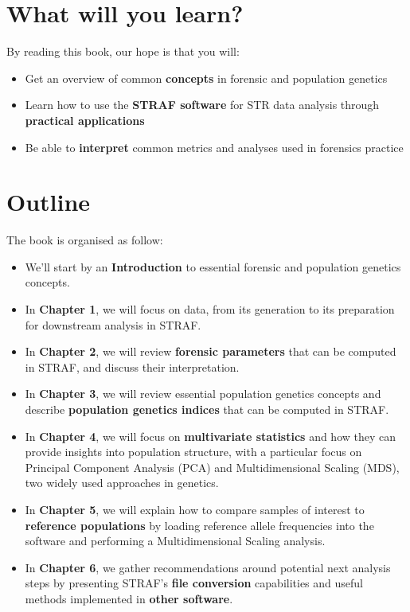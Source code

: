 \documentclass[
]{book}
\begin{document}
\hypertarget{what-will-you-learn}{%
\section*{What will you learn?}\label{what-will-you-learn}}

By reading this book, our hope is that you will:

\begin{itemize}
\item
  Get an overview of common \textbf{concepts} in forensic and population genetics
\item
  Learn how to use the \textbf{STRAF software} for STR data analysis through \textbf{practical applications}
\item
  Be able to \textbf{interpret} common metrics and analyses used in forensics practice
\end{itemize}

\hypertarget{outline}{%
\section*{Outline}\label{outline}}

The book is organised as follow:

\begin{itemize}
\item
  We'll start by an \textbf{Introduction} to essential forensic and population genetics concepts.
\item
  In \textbf{Chapter 1}, we will focus on data, from its generation to its preparation for
  downstream analysis in STRAF.
\item
  In \textbf{Chapter 2}, we will review \textbf{forensic parameters} that can be computed in STRAF,
  and discuss their interpretation.
\item
  In \textbf{Chapter 3}, we will review essential population genetics concepts and
  describe \textbf{population genetics indices} that can be computed in STRAF.
\item
  In \textbf{Chapter 4}, we will focus on \textbf{multivariate statistics} and how they can provide
  insights into population structure, with a particular focus on Principal Component
  Analysis (PCA) and Multidimensional Scaling (MDS), two widely used approaches in genetics.
\item
  In \textbf{Chapter 5}, we will explain how to compare samples of interest to
  \textbf{reference populations} by loading reference allele frequencies into the
  software and performing a Multidimensional Scaling analysis.
\item
  In \textbf{Chapter 6}, we gather recommendations around potential next analysis steps
  by presenting STRAF's \textbf{file conversion} capabilities and useful methods implemented in
  \textbf{other software}.
\end{itemize}
\end{document}
